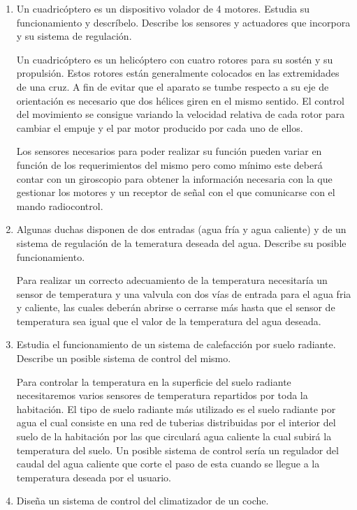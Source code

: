 \documentclass[10pt,a4paper,spanish]{article}
\begin{document}
\begin{enumerate}
    \item Un cuadricóptero es un dispositivo volador de 4 motores. Estudia su funcionamiento y descríbelo. Describe los sensores y actuadores que incorpora y su sistema de regulación.

    \noindent
    Un cuadricóptero es un helicóptero con cuatro rotores para su sostén y su propulsión. Estos rotores están generalmente colocados en las extremidades de una cruz. A fin de evitar que el aparato se tumbe respecto a su eje de orientación es necesario que dos hélices giren en el mismo sentido. El control del movimiento se consigue variando la velocidad relativa de cada rotor para cambiar el empuje y el par motor producido por cada uno de ellos.

    \noindent
    Los sensores necesarios para poder realizar su función pueden variar en función de los requerimientos del mismo pero como mínimo este deberá contar con un giroscopio para obtener la información necesaria con la que gestionar los motores y un receptor de señal con el que comunicarse con el mando radiocontrol.

    \item Algunas duchas disponen de dos entradas (agua fría y agua caliente) y de un sistema de regulación de la temeratura deseada del agua. Describe su posible funcionamiento.

    \noindent
    Para realizar un correcto adecuamiento de la temperatura necesitaría un sensor de temperatura y una valvula con dos vías de entrada para el agua fria y caliente, las cuales deberán abrirse o cerrarse más hasta que el sensor de temperatura sea igual que el valor de la temperatura del agua deseada.

    \item Estudia el funcionamiento de un sistema de calefacción por suelo radiante. Describe un posible sistema de control del mismo.

    \noindent
    Para controlar la temperatura en la superficie del suelo radiante necesitaremos varios sensores de temperatura repartidos por toda la habitación. El tipo de suelo radiante más utilizado es el suelo radiante por agua el cual consiste en una red de tuberias distribuidas por el interior del suelo de la habitación por las que circulará agua caliente la cual subirá la temperatura del suelo. Un posible sistema de control sería un regulador del caudal del agua caliente que corte el paso de esta cuando se llegue a la temperatura deseada por el usuario.

    \newpage
    \item Diseña un sistema de control del climatizador de un coche.


\end{enumerate}
\end{document}
